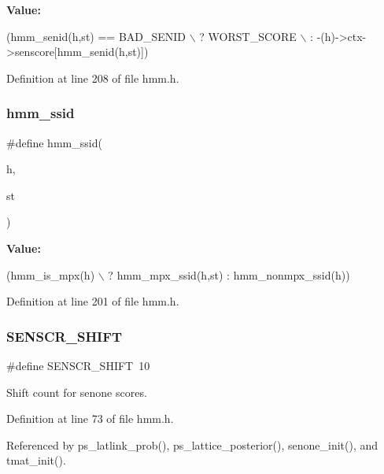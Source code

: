 {\bfseries Value\+:}
\begin{DoxyCode}
(hmm\_senid(h,st) == BAD_SENID                  \(\backslash\)
                          ? WORST_SCORE                                 \(\backslash\)
                          : -(h)->ctx->senscore[hmm\_senid(h,st)])
\end{DoxyCode}


Definition at line 208 of file hmm.\+h.

\mbox{\label{hmm_8h_a373c24cfb5d5e2d732b0b88f716c0d55}} 
\subsubsection{hmm\+\_\+ssid}
{\footnotesize\ttfamily \#define hmm\+\_\+ssid(\begin{DoxyParamCaption}\item[{}]{h,  }\item[{}]{st }\end{DoxyParamCaption})}

{\bfseries Value\+:}
\begin{DoxyCode}
(hmm\_is\_mpx(h)                                   \(\backslash\)
                        ? hmm\_mpx\_ssid(h,st) : hmm\_nonmpx\_ssid(h))
\end{DoxyCode}


Definition at line 201 of file hmm.\+h.

\mbox{\label{hmm_8h_af94da16e3e5b550b9be05b0f07402cc7}} 
\subsubsection{S\+E\+N\+S\+C\+R\+\_\+\+S\+H\+I\+FT}
{\footnotesize\ttfamily \#define S\+E\+N\+S\+C\+R\+\_\+\+S\+H\+I\+FT~10}



Shift count for senone scores. 



Definition at line 73 of file hmm.\+h.



Referenced by ps\+\_\+latlink\+\_\+prob(), ps\+\_\+lattice\+\_\+posterior(), senone\+\_\+init(), and tmat\+\_\+init().

\mbox{\label{hmm_8h_a833f100ee293ad0f1c03f2a5ef9be77a}} 
